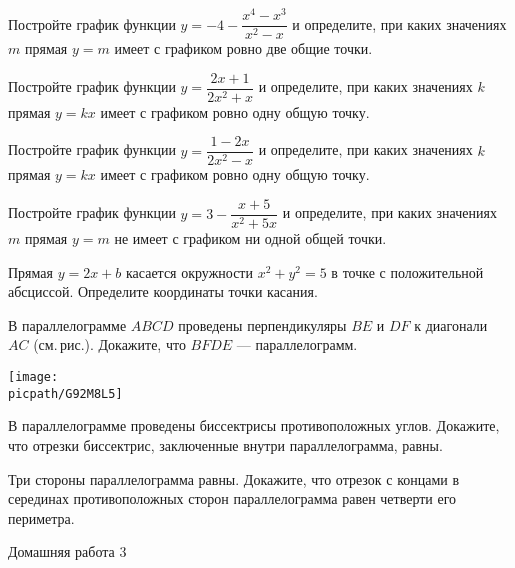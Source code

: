\begin{class}[number=6]
	\begin{listofex}
		\item Постройте график функции \( y=-4-\dfrac{x^4-x^3}{x^2-x} \) и определите, при каких значениях \( m \) прямая \( y=m \) имеет с графиком ровно две общие точки.
		\item Постройте график функции \( y=\dfrac{2x+1}{2x^2+x} \) и определите, при каких значениях \( k \) прямая \( y=kx \) имеет с графиком ровно одну общую точку.
		\item Постройте график функции \( y=\dfrac{1-2x}{2x^2-x} \) и определите, при каких значениях \( k \) прямая \( y=kx \) имеет с графиком ровно одну общую точку.
		\item Постройте график функции \( y=3-\dfrac{x+5}{x^2+5x} \) и определите, при каких значениях \( m \) прямая \( y=m \) не имеет с графиком ни одной общей точки.
		\item Прямая \( y=2x+b \) касается окружности \( x^2+y^2=5 \) в точке с положительной абсциссой. Определите координаты точки касания.
		\item \begin{minipage}[t]{\bodywidth}
			В параллелограмме \( ABCD \) проведены перпендикуляры \( BE \) и \( DF \) к диагонали \( AC \) (см. рис.). Докажите, что \( BFDE \) --- параллелограмм.
		\end{minipage}
		\gapwidth
		\begin{minipage}[t]{\picwidth}
			\texttt{[image: \\picpath/G92M8L5]}
		\end{minipage}
		\item В параллелограмме проведены биссектрисы противоположных углов. Докажите, что отрезки биссектрис, заключенные внутри параллелограмма, равны.
		\item Три стороны параллелограмма равны. Докажите, что отрезок с концами в серединах противоположных сторон параллелограмма равен четверти его периметра.
	\end{listofex}
\end{class}

\begin{homework}[number=3]
	\begin{listofex}
		\item Домашняя работа 3
	\end{listofex}
\end{homework}


